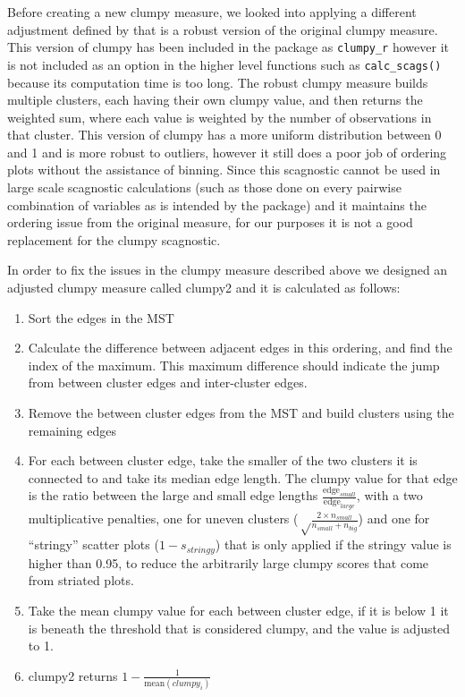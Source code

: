 Before creating a new clumpy measure, we looked into applying a different adjustment defined by \citet{robust} that is a robust version of the original clumpy measure. This version of clumpy has been included in the package as \texttt{clumpy\_r} however it is not included as an option in the higher level functions such as \texttt{calc\_scags()} because its computation time is too long. The robust clumpy measure builds multiple clusters, each having their own clumpy value, and then returns the weighted sum, where each value is weighted by the number of observations in that cluster. This version of clumpy has a more uniform distribution between 0 and 1 and is more robust to outliers, however it still does a poor job of ordering plots without the assistance of binning. Since this scagnostic cannot be used in large scale scagnostic calculations (such as those done on every pairwise combination of variables as is intended by the package) and it maintains the ordering issue from the original measure, for our purposes it is not a good replacement for the clumpy scagnostic.

In order to fix the issues in the clumpy measure described above we designed an adjusted clumpy measure called clumpy2 and it is calculated as follows:

\begin{enumerate}
\def\labelenumi{\arabic{enumi}.}
\tightlist
\item
  Sort the edges in the MST
\item
  Calculate the difference between adjacent edges in this ordering, and find the index of the maximum. This maximum difference should indicate the jump from between cluster edges and inter-cluster edges.
\item
  Remove the between cluster edges from the MST and build clusters using the remaining edges
\item
  For each between cluster edge, take the smaller of the two clusters it is connected to and take its median edge length. The clumpy value for that edge is the ratio between the large and small edge lengths \(\frac{\mbox{edge}_{small}}{\mbox{edge}_{large}}\), with a two multiplicative penalties, one for uneven clusters (\(\sqrt\frac{2\times n_{small}}{n_{small}+n_{big}}\)) and one for ``stringy'' scatter plots (\(1-s_{stringy}\)) that is only applied if the stringy value is higher than 0.95, to reduce the arbitrarily large clumpy scores that come from striated plots.
\item
  Take the mean clumpy value for each between cluster edge, if it is below 1 it is beneath the threshold that is considered clumpy, and the value is adjusted to 1.
\item
  clumpy2 returns \(1-\frac{1}{\mbox{mean}(clumpy_i)}\)
\end{enumerate}

